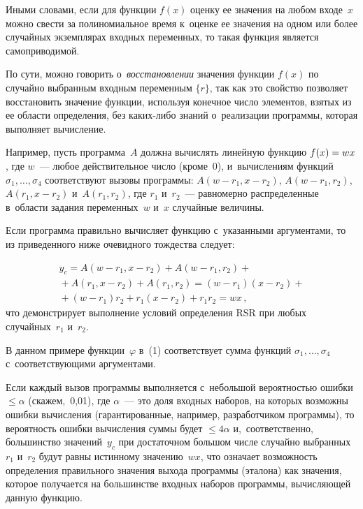 \begin{multicols}{2}
    Иными словами, если для функции $f(x)$ оценку ее значения на любом 
входе~$x$ можно свести за полиномиальное время к~оценке ее значения на 
одном или более случайных экземплярах входных переменных, то такая 
функция является самоприводимой.
    
    По сути, можно говорить о~\textit{восстановлении} значения функции 
$f(x)$ по случайно выбранным входным переменным $\{r\}$, так как это 
свойство позволяет восстановить значение функции, используя конечное 
число элементов, взятых из ее области определения, без ка\-ких-ли\-бо 
знаний о~реализации программы, которая выполняет вычисление.
    
    Например, пусть программа~$A$ должна вы\-чис\-лять линейную функцию 
$f(x) \hm= wx$, где $w$~--- любое действительное число (кроме~0), 
и~вы\-чис\-ле\-ни\-ям функций $\sigma_1,\ldots ,\sigma_4$ соответствуют вызовы 
программы:
    $A\left(w-r_1, x-r_2\right)$, 
    $A\left(w-r_1, r_2\right)$, $A\left(r_1, x-r_2\right)$ и~$A\left(r_1, 
r_2\right)$,
где $r_1$ и~$r_2$~--- равномерно распределенные в~области задания 
переменных~$w$ и~$x$ случайные величины.

    Если программа правильно вычисляет функцию с~указанными 
аргументами, то из приведенного ниже очевидного тождества следует:

\vspace*{-5pt}

\noindent
    \begin{multline}
    y_c = A\left(w-r_1, x-r_2\right) + A\left(w-r_1, r_2\right) + {}\\
    {}+A\left(r_1, x-r_2\right) + 
A\left(r_1, r_2\right) = \left(w-r_1\right)\left(x-r_2\right) + {}\\
{}+ \left(w-r_1\right)r_2 + r_1\left(x-r_2\right) + 
r_1r_2 = wx\,,
    \label{e2-bf}
    \end{multline}
    что демонстрирует выполнение условий определения RSR при любых 
случайных~$r_1$ и~$r_2$.

    В данном примере функции~$\varphi$ в~(1) соответствует сумма 
функций $\sigma_1, \ldots, \sigma_4$ с~соответствующими аргументами.
    
    Если каждый вызов программы выполняется с~небольшой вероятностью 
ошибки $\leq\alpha$ (скажем,~0,01), где $\alpha$~--- это доля входных 
наборов, на которых возможны ошибки вычисления (гарантированные, 
например, разработчиком программы), то вероятность ошибки вычисления 
суммы будет $\leq 4\alpha$ и,~соответственно, большинство значений~$y_c$ 
при достаточном большом числе случайно выбранных~$r_1$ и~$r_2$ будут 
равны истинному значению~$wx$, что означает возможность определения 
правильного значения выхода программы (эталона) как значения, которое 
получается на большинстве входных наборов программы, вычисляющей 
данную функцию.
    

\end{multicols}
